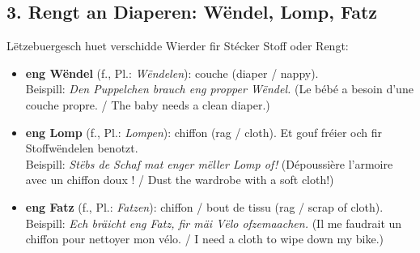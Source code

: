 \subsection*{3. Rengt an Diaperen: Wëndel, Lomp, Fatz}
Lëtzebuergesch huet verschidde Wierder fir Stécker Stoff oder Rengt:
\begin{itemize}
    \item \textbf{eng Wëndel} (f., Pl.: \textit{Wëndelen}): couche (diaper / nappy). \\
    Beispill: \textit{Den Puppelchen brauch eng propper Wëndel.} (Le bébé a besoin d'une couche propre. / The baby needs a clean diaper.)
    
    \item \textbf{eng Lomp} (f., Pl.: \textit{Lompen}): chiffon (rag / cloth). Et gouf fréier och fir Stoffwëndelen benotzt. \\
    Beispill: \textit{Stëbs de Schaf mat enger mëller Lomp of!} (Dépoussière l'armoire avec un chiffon doux ! / Dust the wardrobe with a soft cloth!)
    
    \item \textbf{eng Fatz} (f., Pl.: \textit{Fatzen}): chiffon / bout de tissu (rag / scrap of cloth). \\
    Beispill: \textit{Ech bräicht eng Fatz, fir mäi Vëlo ofzemaachen.} (Il me faudrait un chiffon pour nettoyer mon vélo. / I need a cloth to wipe down my bike.)
\end{itemize}

